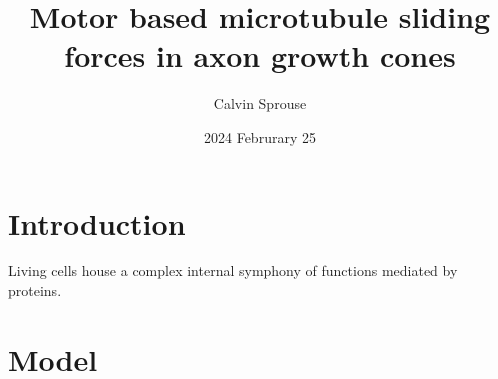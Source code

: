 \documentclass[a4paper, 12pt]{article}
\title{Motor based microtubule sliding forces in axon growth cones}
\author{Calvin Sprouse}
\affil{PHYS 322, Winter 2024}
\date{2024 Februrary 25}
\begin{document}
\maketitle

\section*{Introduction}
Living cells house a complex internal symphony of functions mediated by proteins. 

\section*{Model}



\end{document}

